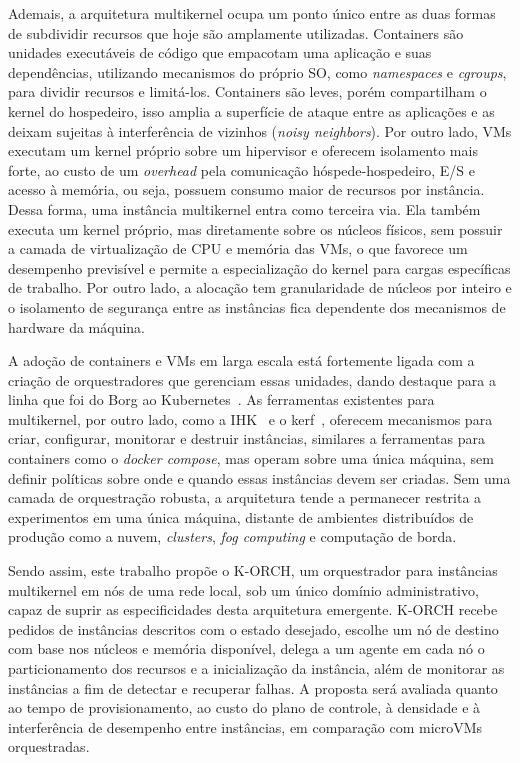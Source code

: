 \documentclass[12pt]{article}
\begin{document}
Ademais, a arquitetura multikernel ocupa um ponto único entre as duas formas de subdividir recursos que hoje são amplamente utilizadas.
Containers são unidades executáveis de código que empacotam uma aplicação e suas dependências, utilizando mecanismos do próprio SO, como \textit{namespaces} e \textit{cgroups},
para dividir recursos e limitá-los.
Containers são leves, porém compartilham o kernel do hospedeiro, isso amplia a superfície de ataque entre
as aplicações e as deixam sujeitas à interferência de vizinhos (\textit{noisy neighbors}).
Por outro lado, VMs executam um kernel
próprio sobre um hipervisor e oferecem isolamento mais forte, ao custo de um \textit{overhead} pela comunicação hóspede-hospedeiro,
E/S e acesso à memória, ou seja, possuem consumo maior de recursos por instância.
Dessa forma, uma instância multikernel entra como terceira via.
Ela também executa um kernel próprio, mas diretamente sobre os núcleos físicos, sem possuir a camada de virtualização de CPU e memória das VMs, o que favorece
um desempenho previsível e permite a especialização do kernel para cargas específicas de trabalho.
Por outro lado, a alocação tem granularidade de núcleos por inteiro e o isolamento de segurança entre as instâncias fica dependente dos mecanismos
de hardware da máquina.

A adoção de containers e VMs em larga escala está fortemente ligada com a criação de orquestradores que gerenciam essas
unidades, dando destaque para a linha que foi do Borg ao
Kubernetes~\cite{burns2016borg}.
As ferramentas existentes para multikernel, por outro lado, como a IHK~\cite{shimosawa2014ihk} e o kerf~\cite{multikernel2025kerf},
oferecem mecanismos para criar, configurar, monitorar e destruir instâncias, similares a ferramentas para containers como o \textit{docker compose},
mas operam sobre uma única máquina, sem definir políticas sobre onde e quando essas instâncias devem ser criadas.
Sem uma camada de orquestração robusta, a arquitetura tende a permanecer restrita a experimentos em uma única máquina, distante de
ambientes distribuídos de produção como a nuvem, \textit{clusters}, \textit{fog computing} e computação de borda.

Sendo assim, este trabalho propõe o K-ORCH, um orquestrador para instâncias multikernel em nós de uma rede local,
sob um único domínio administrativo, capaz de suprir as especificidades desta arquitetura emergente.
K-ORCH recebe pedidos de
instâncias descritos com o estado desejado, escolhe um nó de destino com base nos núcleos e memória disponível, delega a
um agente em cada nó o particionamento dos recursos e a inicialização da instância,
além de monitorar as instâncias a fim de detectar e recuperar falhas.
A proposta será avaliada quanto ao tempo de
provisionamento, ao custo do plano de controle, à densidade e à interferência de desempenho entre instâncias,
em comparação com microVMs orquestradas.
\end{document}
